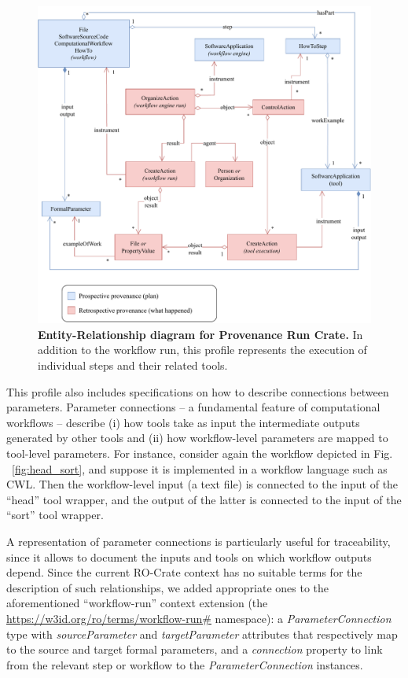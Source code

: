\documentclass[10pt,letterpaper]{article}
\begin{document}
\begin{figure}[!h]
\includegraphics[width=\textwidth]{wrroc-figure3.drawio.pdf}
\caption{{\bf Entity-Relationship diagram for Provenance Run Crate.}
In addition to the workflow run, this profile represents the execution of individual steps and their related tools.}
\label{fig:provenance_crate_er}
\end{figure}

This profile also includes specifications on how to describe connections between parameters.
Parameter connections -- a fundamental feature of computational workflows -- describe (i) how tools take as input the intermediate outputs generated by other tools and (ii) how workflow-level parameters are mapped to tool-level parameters.
For instance, consider again the workflow depicted in Fig. ~\ref{fig:head_sort},
and suppose it is implemented in a workflow language such as CWL. Then the workflow-level input (a text file) is connected to the input of the “head” tool wrapper, and the output of the latter is connected to the input of the “sort” tool wrapper.


A representation of parameter connections is particularly useful for traceability, since it allows to document the inputs and tools on which workflow outputs depend.
Since the current RO-Crate context has no suitable terms for the description of such relationships, 
we added appropriate ones to the aforementioned  ``workflow-run'' context extension (the \url{https://w3id.org/ro/terms/workflow-run\#} namespace):
a \emph{ParameterConnection} type with
\emph{sourceParameter} and \emph{targetParameter} attributes that respectively map to the source and target formal parameters, and a
\emph{connection} property to link from the relevant step or workflow to the \emph{ParameterConnection} instances.
\end{document}
